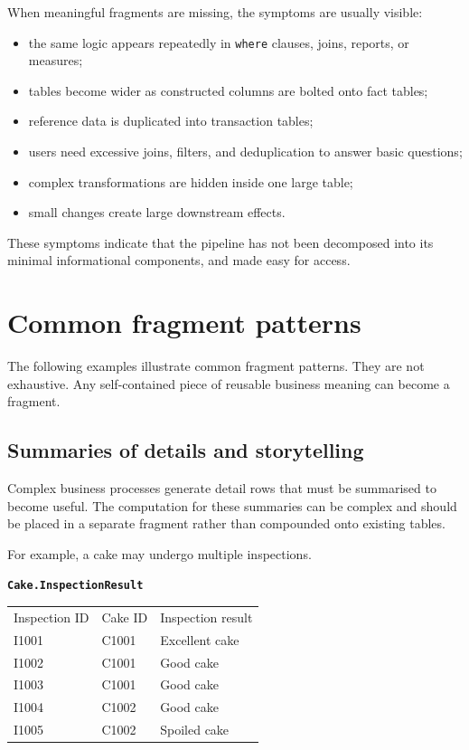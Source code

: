 \documentclass[10pt,openany,10pt]{book}
\providecommand{\tightlist}{%
  \setlength{\itemsep}{0pt}\setlength{\parskip}{0pt}}
\newcounter{none}
\let\podeToprule\toprule
\let\podeMidrule\midrule
\let\podeBottomrule\bottomrule
\renewcommand{\toprule}{\arrayrulecolor{pbiGrid}\podeToprule}
\renewcommand{\midrule}{\arrayrulecolor{pbiGrid}\podeMidrule}
\renewcommand{\bottomrule}{\arrayrulecolor{pbiGrid}\podeBottomrule}
\begin{document}
When meaningful fragments are missing, the symptoms are usually visible:

\begin{itemize}
\tightlist
\item
  the same logic appears repeatedly in \texttt{where} clauses, joins,
  reports, or measures;
\item
  tables become wider as constructed columns are bolted onto fact
  tables;
\item
  reference data is duplicated into transaction tables;
\item
  users need excessive joins, filters, and deduplication to answer basic
  questions;
\item
  complex transformations are hidden inside one large table;
\item
  small changes create large downstream effects.
\end{itemize}

These symptoms indicate that the pipeline has not been decomposed into
its minimal informational components, and made easy for access.

\section{Common fragment patterns}\label{common-fragment-patterns}

The following examples illustrate common fragment patterns. They are not
exhaustive. Any self-contained piece of reusable business meaning can
become a fragment.

\subsection{Summaries of details and
storytelling}\label{summaries-of-details-and-storytelling}

Complex business processes generate detail rows that must be summarised
to become useful. The computation for these summaries can be complex and
should be placed in a separate fragment rather than compounded onto
existing tables.

For example, a cake may undergo multiple inspections.

\textbf{\texttt{Cake.InspectionResult}}

{\def\LTcaptype{none} %
\begin{longtable}[]{@{}lll@{}}
\toprule\noalign{}
Inspection ID & Cake ID & Inspection result \\
\midrule\noalign{}
\endhead
\bottomrule\noalign{}
\endlastfoot
I1001 & C1001 & Excellent cake \\
I1002 & C1001 & Good cake \\
I1003 & C1001 & Good cake \\
I1004 & C1002 & Good cake \\
I1005 & C1002 & Spoiled cake \\
\end{longtable}
}
\end{document}
